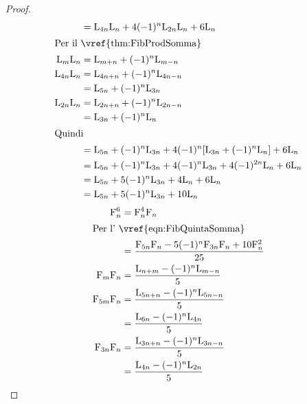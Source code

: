 \begin{proof}
\begin{align*}
		={}                & \Luc{4n}\Luc{n}+4(-1)^n\Luc{2n}\Luc{n}+6\Luc{n}                      \\
		\intertext{Per il~\vref{thm:FibProdSomma}}
		\Luc{m}\Luc{n}={}  & \Luc{m+n}+(-1)^{n}\Luc{m-n}                                          \\
		\Luc{4n}\Luc{n}={} & \Luc{4n+n}+(-1)^{n}\Luc{4n-n}                                        \\
		={}                & \Luc{5n}+(-1)^{n}\Luc{3n}                                            \\
		\Luc{2n}\Luc{n}={} & \Luc{2n+n}+(-1)^{n}\Luc{2n-n}                                        \\
		={}                & \Luc{3n}+(-1)^{n}\Luc{n}                                             \\
		\intertext{Quindi}
		={}                & \Luc{5n}+(-1)^{n}\Luc{3n}+4(-1)^n[\Luc{3n}+(-1)^{n}\Luc{n}]+6\Luc{n} \\
		={}                & \Luc{5n}+(-1)^{n}\Luc{3n}+4(-1)^n\Luc{3n}+4(-1)^{2n}\Luc{n}+6\Luc{n} \\
		={}                & \Luc{5n}+5(-1)^n\Luc{3n}+4\Luc{n}+6\Luc{n}                           \\
		={}                & \Luc{5n}+5(-1)^n\Luc{3n}+10\Luc{n}                                   \\
	\end{align*}
	\begin{align*}
		\Fib{n}^6={}       & \Fib{n}^4\Fib{n}                                                                           \\
		\intertext{Per l'~\vref{eqn:FibQuintaSomma}}
		={}                & \dfrac{\Fib{5n}\Fib{n}-5(-1)^n\Fib{3n}\Fib{n}+10\Fib{n}^2}{25}                             \\
		\Fib{m}\Fib{n}={}  & \dfrac{\Luc{n+m}-(-1)^n\Luc{m-n}}{5}                                                       \\
		\Fib{5m}\Fib{n}={} & \dfrac{\Luc{5n+n}-(-1)^n\Luc{5n-n}}{5}                                                     \\
		={}                & \dfrac{\Luc{6n}-(-1)^n\Luc{4n}}{5}                                                         \\
		\Fib{3n}\Fib{n}={} & \dfrac{\Luc{3n+n}-(-1)^n\Luc{3n-n}}{5}                                                     \\
		={}                & \dfrac{\Luc{4n}-(-1)^n\Luc{2n}}{5}                                                         \\

\end{align*}
\end{proof}

